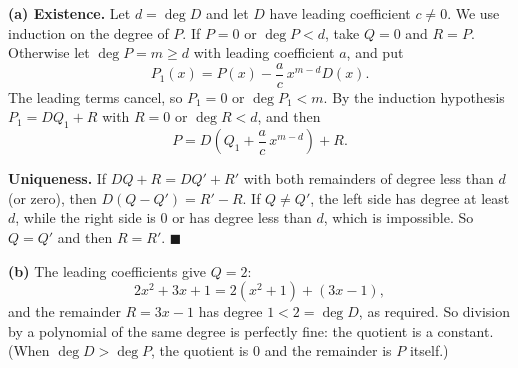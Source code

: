 \textbf{(a) Existence.} Let $d=\deg D$ and let $D$ have leading coefficient $c\ne0$. We use induction on the degree of $P$. If $P=0$ or $\deg P<d$, take $Q=0$ and $R=P$. Otherwise let $\deg P=m\ge d$ with leading coefficient $a$, and put
\[P_1(x)=P(x)-\dfrac ac\,x^{m-d}D(x).\]
The leading terms cancel, so $P_1=0$ or $\deg P_1<m$. By the induction hypothesis $P_1=DQ_1+R$ with $R=0$ or $\deg R<d$, and then
\[P=D\left(Q_1+\dfrac ac\,x^{m-d}\right)+R.\]

\textbf{Uniqueness.} If $DQ+R=DQ'+R'$ with both remainders of degree less than $d$ (or zero), then $D(Q-Q')=R'-R$. If $Q\ne Q'$, the left side has degree at least $d$, while the right side is $0$ or has degree less than $d$, which is impossible. So $Q=Q'$ and then $R=R'$. $\blacksquare$

\textbf{(b)} The leading coefficients give $Q=2$:
\[2x^2+3x+1=2\left(x^2+1\right)+(3x-1),\]
and the remainder $R=3x-1$ has degree $1<2=\deg D$, as required. So division by a polynomial of the same degree is perfectly fine: the quotient is a constant. (When $\deg D>\deg P$, the quotient is $0$ and the remainder is $P$ itself.)
